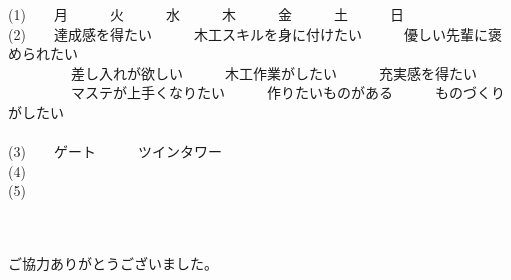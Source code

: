 \documentclass[paper=b4j, landscape, fleqn, jafontsize=9pt, jafontscale=1, head_space=25.5mm, foot_space=15mm, fore-edge=14.5mm, gutter=14.5mm, hanging_punctuation, baselineskip=7mm]{jlreq}
\begin{document}
\begin{answersheet}
\noindent (1)~~\hspace{1.5\zw}　月　　　火　　　水　　　木　　　金　　　土　　　日\\
\noindent (2)~~\hspace{1.5\zw}　達成感を得たい　　　木工スキルを身に付けたい　　　優しい先輩に褒められたい\\
~~~~~~~　差し入れが欲しい　　　木工作業がしたい　　　充実感を得たい\\
~~~~~~~　マステが上手くなりたい　　　作りたいものがある　　　ものづくりがしたい\\
~~~~~~~\\
\noindent (3)~~\hspace{1.5\zw}　ゲート　　　ツインタワー\\
\noindent (4)~~\kasen{}\\
\noindent (5)~~ \kasen{}\\~~~~~~~\kasen{}\\~~~~~~~\kasen{}\\
\begin{flushright}
    ご協力ありがとうございました。
\end{flushright}
\end{answersheet}
\end{document}
